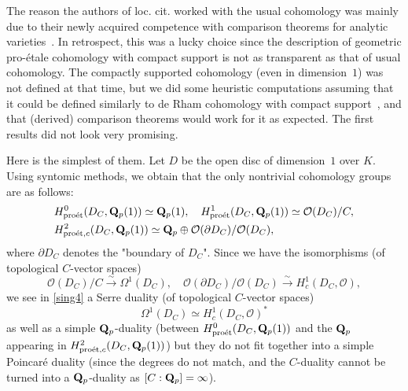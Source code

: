 \documentclass[10pt,reqno]{amsart}
\theoremstyle{definition}
\theoremstyle{remark}
\newcommand{\proeet}{\operatorname{pro\acute{e}t} }
\newcommand{\so}{{\mathcal O}}
\numberwithin{equation}{section}
\def\Q{{\bf Q}} \def\Z{{\bf Z}}
\def\BORD{$\partial D_C$, $\partial X$}
\numberwithin{equation}{section}
\begin{document}
 The reason the authors  of loc. cit. 
worked with the usual cohomology was mainly due to their newly acquired competence
with comparison theorems for analytic varieties~\cite{CN1}. 
In retrospect, this was a lucky choice since the description of
geometric pro-\'etale cohomology with compact support is not as transparent as that
of usual cohomology. The compactly supported cohomology (even in dimension~$1$)
was not defined at that time, but we did some heuristic computations
assuming that it could be defined similarly
to de Rham cohomology with compact support~\cite{vdP}, and that (derived) 
comparison theorems would work for it as expected. 
The first results did not look very promising.

Here is the simplest of them. 
Let $D$ be the open disc of   dimension~$1$ over $K$.   Using syntomic methods,
we obtain that the only nontrivial cohomology groups are as \index{BORD@\BORD}follows:
\begin{align}\label{sing4}
& H^0_{\proeet}(D_C,\Q_p(1))\simeq \Q_p(1),\quad H^1_{\proeet}(D_C,\Q_p(1))\simeq \so(D_C)/C,\\
&  H^2_{{\proeet},c}(D_C,\Q_p(1))\simeq \Q_p\oplus \so(\partial D_C)/\so(D_C),\notag
\end{align}
where $\partial D_C$ denotes the "boundary of $D_C$". Since we have the isomorphisms 
(of topological $C$-vector spaces)
$$\so(D_C)/C\stackrel{\sim}{\to} \Omega^1(D_C),\quad \so(\partial D_C)/\so(D_C)\stackrel{\sim}{\to} H^1_c(D_C,\so), 
$$we see in \eqref{sing4} a Serre duality (of topological $C$-vector spaces)
$$
 \Omega^1(D_C)\simeq H^1_c(D_C,\so)^*
$$
as well as a simple $\Q_p$-duality (between $H^0_{\proeet}(D_C,\Q_p(1))$ and the $\Q_p$ appearing in 
$H^2_{{\proeet},c}(D_C,\Q_p(1))$) but they do not fit together into a simple  
Poincar\'e duality (since the degrees do not match, and the $C$-duality cannot be turned into
a $\Q_p$-duality as $[C:\Q_p]=\infty$). 
\end{document}
